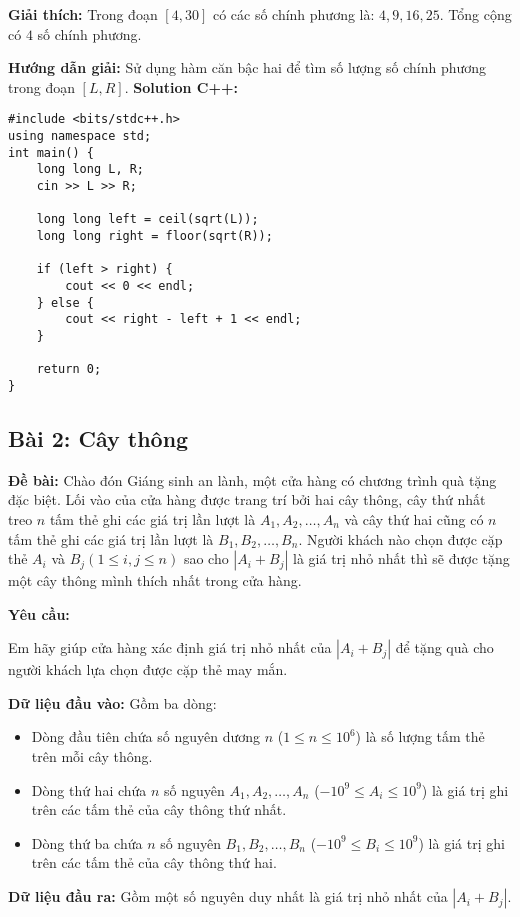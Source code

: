\documentclass[12pt]{scrartcl}  %
\begin{document}
\textbf{Giải thích:}
Trong đoạn $[4, 30]$ có các số chính phương là: $4, 9, 16, 25$. Tổng cộng có $4$ số chính phương.

\textbf{Hướng dẫn giải:}
Sử dụng hàm căn bậc hai để tìm số lượng số chính phương trong đoạn $[L, R]$.
\textbf{Solution C++:}
\begin{lstlisting}
#include <bits/stdc++.h>
using namespace std;
int main() {
    long long L, R;
    cin >> L >> R;
    
    long long left = ceil(sqrt(L));
    long long right = floor(sqrt(R));
    
    if (left > right) {
        cout << 0 << endl;
    } else {
        cout << right - left + 1 << endl;
    }
    
    return 0;
}
\end{lstlisting}

\subsection{Bài 2: Cây thông}

\textbf{Đề bài:}
Chào đón Giáng sinh an lành, một cửa hàng có chương trình quà tặng đặc biệt. Lối vào của cửa hàng được trang trí bởi hai cây thông, cây thứ nhất treo $n$ tấm thẻ ghi các giá trị lần lượt là $A_1, A_2, \ldots, A_n$ và cây thứ hai cũng có $n$ tấm thẻ ghi các giá trị lần lượt là $B_1, B_2, \ldots, B_n$. Người khách nào chọn được cặp thẻ $A_i$ và $B_j (1 \leq i,j \leq n)$ sao cho $|A_i + B_j|$ là giá trị nhỏ nhất thì sẽ được tặng một cây thông mình thích nhất trong cửa hàng. 

\textbf{Yêu cầu:}

Em hãy giúp cửa hàng xác định giá trị nhỏ nhất của $|A_i + B_j|$ để tặng quà cho người khách lựa chọn được cặp thẻ may mắn.

\textbf{Dữ liệu đầu vào:}
Gồm ba dòng:
\begin{itemize}
    \item Dòng đầu tiên chứa số nguyên dương $n$ ($1 \leq n \leq 10^6$) là số lượng tấm thẻ trên mỗi cây thông.
    \item Dòng thứ hai chứa $n$ số nguyên $A_1, A_2, \ldots, A_n$ ($-10^9 \leq A_i \leq 10^9$) là giá trị ghi trên các tấm thẻ của cây thông thứ nhất.
    \item Dòng thứ ba chứa $n$ số nguyên $B_1, B_2, \ldots, B_n$ ($-10^9 \leq B_i \leq 10^9$) là giá trị ghi trên các tấm thẻ của cây thông thứ hai.
\end{itemize}

\textbf{Dữ liệu đầu ra:}
Gồm một số nguyên duy nhất là giá trị nhỏ nhất của $|A_i + B_j|$.
\end{document}
